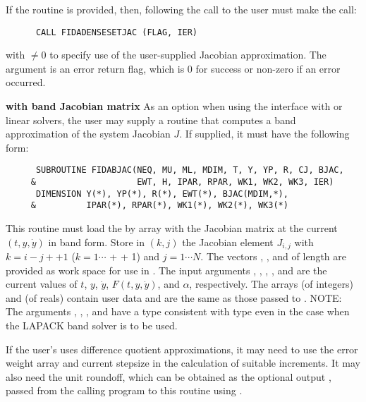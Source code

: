 \begin{Steps}
  If the  routine is provided, then, following the call to 
  the user must make the call:
\begin{verbatim}
      CALL FIDADENSESETJAC (FLAG, IER)
\end{verbatim}
  with  $\neq 0$ to specify use of the user-supplied Jacobian
  approximation.  The argument  is an error return flag, which is $0$
  for success or non-zero if an error occurred.


  {\bf {\idadls} with band Jacobian matrix}
   As an option when using the {\idadls} interface with
  {\sunlinsolband} or {\sunlinsollapband} linear solvers, the user may
  supply a routine that computes a band approximation of the system
  Jacobian  $J$. If supplied, it must have the following form:
\begin{verbatim}
      SUBROUTINE FIDABJAC(NEQ, MU, ML, MDIM, T, Y, YP, R, CJ, BJAC,
     &                    EWT, H, IPAR, RPAR, WK1, WK2, WK3, IER)
      DIMENSION Y(*), YP(*), R(*), EWT(*), BJAC(MDIM,*),
     &          IPAR(*), RPAR(*), WK1(*), WK2(*), WK3(*)
\end{verbatim}
  This routine must load the  by  array  with the
  Jacobian matrix at the current $(t, y, \dot{y})$ in band form.  Store in
  $(k,j)$ the Jacobian element $J_{i,j}$ with $k = i - j + $$ + 1$
  ($k = 1 \cdots $ +  + 1) and $j = 1 \cdots N$. The vectors
  , , and  of length  are provided as work space
  for use in .
  The input arguments , , , , and  are the
  current values of $t$, $y$, $\dot{y}$, $F(t,y,\dot{y})$, and $\alpha$, respectively.
  The arrays  (of integers) and  (of reals) contain user data
  and are the same as those passed to .
  NOTE: The arguments , , , and  have a type
  consistent with {\CC} type  even in the case when the LAPACK band
  solver is to be used.

  If the user's  uses difference quotient approximations, it
  may need to use the error weight array  and current stepsize 
  in the calculation of suitable increments.  It may also need the unit
  roundoff, which can be obtained as the optional output ,
  passed from the calling program to this routine using .


\end{Steps}
